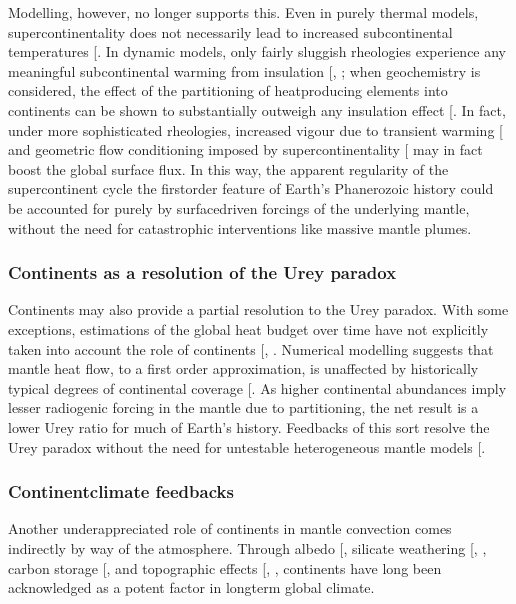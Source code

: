 \documentclass[letterpaper,10pt,english]{jupyterBook}
\begin{document}
\sphinxAtStartPar
Modelling, however, no longer supports this. Even in purely thermal models, supercontinentality does not necessarily lead to increased sub\sphinxhyphen{}continental temperatures {[}\sphinxcite{references:id263}{]}. In dynamic models, only fairly sluggish rheologies experience any meaningful sub\sphinxhyphen{}continental warming from insulation {[}, \sphinxcite{references:id257}{]}; when geochemistry is considered, the effect of the partitioning of heat\sphinxhyphen{}producing elements into continents can be shown to substantially outweigh any insulation effect {[}\sphinxcite{references:id262}{]}. In fact, under more sophisticated rheologies, increased vigour due to transient warming {[}\sphinxcite{references:id676}{]} and geometric flow conditioning imposed by supercontinentality {[}\sphinxcite{references:id438}{]} may in fact boost the global surface flux. In this way, the apparent regularity of the supercontinent cycle \sphinxhyphen{} the first\sphinxhyphen{}order feature of Earth’s Phanerozoic history \sphinxhyphen{} could be accounted for purely by surface\sphinxhyphen{}driven forcings of the underlying mantle, without the need for catastrophic interventions like massive mantle plumes.


\subsubsection{Continents as a resolution of the Urey paradox}
\label{\detokenize{content/chapter_01_background/main:continents-as-a-resolution-of-the-urey-paradox}}
\sphinxAtStartPar
Continents may also provide a partial resolution to the Urey paradox. With some exceptions, estimations of the global heat budget over time have not explicitly taken into account the role of continents {[}, \sphinxcite{references:id292}{]}. Numerical modelling suggests that mantle heat flow, to a first order approximation, is unaffected by historically typical degrees of continental coverage {[}\sphinxcite{references:id400}{]}. As higher continental abundances imply lesser radiogenic forcing in the mantle due to partitioning, the net result is a lower Urey ratio for much of Earth’s history. Feedbacks of this sort resolve the Urey paradox without the need for untestable heterogeneous mantle models {[}\sphinxcite{references:id402}{]}.


\subsubsection{Continent\sphinxhyphen{}climate feedbacks}
\label{\detokenize{content/chapter_01_background/main:continent-climate-feedbacks}}
\sphinxAtStartPar
Another under\sphinxhyphen{}appreciated role of continents in mantle convection comes indirectly by way of the atmosphere. Through albedo {[}\sphinxcite{references:id249}{]}, silicate weathering {[}, \sphinxcite{references:id253}{]}, carbon storage {[}\sphinxcite{references:id251}{]}, and topographic effects {[}, \sphinxcite{references:id248}{]}, continents have long been acknowledged as a potent factor in long\sphinxhyphen{}term global climate.
\end{document}
